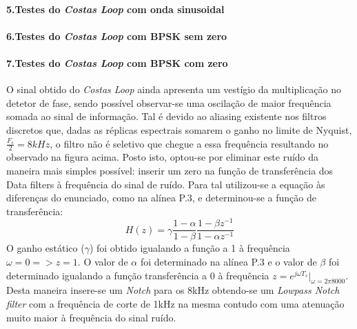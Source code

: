 \documentclass[11pt]{article}
\numberwithin{equation}{section}
\begin{document}
\paragraph{5.Testes do \textit{Costas Loop} com onda sinusoidal} \hspace{0pt}


\paragraph{6.Testes do \textit{Costas Loop} com BPSK sem zero}

\paragraph{7.Testes do \textit{Costas Loop} com BPSK com zero} \hspace{0pt}

O sinal obtido do \textit{Costas Loop} ainda apresenta um vestígio da multiplicação no detetor de fase, sendo possível observar-se uma oscilação de maior frequência somada ao sinal de informação. Tal é devido ao aliasing existente nos filtros discretos que, dadas as réplicas espectrais somarem o ganho no limite de Nyquist, $\frac{F_s}{2} = 8kHz$, o filtro  não é seletivo que chegue a essa frequência resultando no observado na figura acima. Posto isto, optou-se por eliminar este ruído da maneira mais simples possível: inserir um zero na função de transferência dos Data filters à frequência do sinal de ruído. Para tal utilizou-se a equação às diferenças do enunciado, como na alínea P.3, e determinou-se a função de transferência:
\begin{equation}
H(z) = \gamma\frac{1-\alpha}{1-\beta}\dfrac{1-\beta z^{-1}}{1-\alpha z^{-1}}
\end{equation}
O ganho estático ($\gamma$) foi obtido igualando a função a 1 à frequência $\omega=0 => z=1$. O valor de $\alpha$ foi determinado na alínea P.3 e o valor de $\beta$ foi determinado igualando a função transferência a 0 à frequência $z=e^{j\omega T_s}|_{\omega=2\pi8000}$. Desta maneira insere-se um \textit{Notch} para os 8kHz obtendo-se um \textit{Lowpass Notch filter} com a frequência de corte de 1kHz na mesma contudo com uma atenuação muito maior à frequência do sinal ruído.
\end{document}
